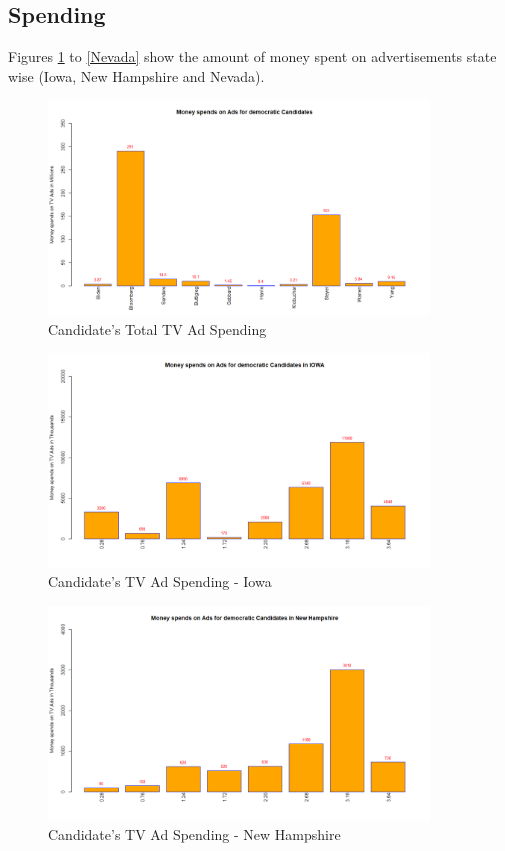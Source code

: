 \subsection{Spending}

Figures \ref{MoneyspendinAds} to \ref{Nevada} show the amount of money spent on advertisements state wise (Iowa, New Hampshire and Nevada).

\begin{figure}[H]
    \centering
    \includegraphics[width=0.9\textwidth]{figures/MoneyspendinAds.png}
    \caption{Candidate's Total TV Ad Spending}
    \label{MoneyspendinAds}
\end{figure}

\begin{figure}[H]
    \centering
    \includegraphics[width=0.9\textwidth]{figures/IOWA.png}
    \caption{Candidate's TV Ad Spending - Iowa}
    \label{IOWA}
\end{figure}

\begin{figure}[H]
    \centering
    \includegraphics[width=0.9\textwidth]{figures/Newhampshire.png}
    \caption{Candidate's TV Ad Spending - New Hampshire}
    \label{Newhampshire}
\end{figure}

